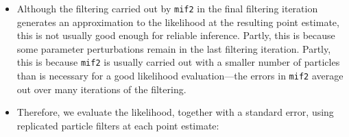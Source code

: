 \documentclass[]{article}
\newenvironment{Shaded}{\begin{snugshade}}{\end{snugshade}}
\newcommand{\KeywordTok}[1]{\textcolor[rgb]{0.13,0.29,0.53}{\textbf{#1}}}
\newcommand{\DataTypeTok}[1]{\textcolor[rgb]{0.13,0.29,0.53}{#1}}
\newcommand{\DecValTok}[1]{\textcolor[rgb]{0.00,0.00,0.81}{#1}}
\newcommand{\FloatTok}[1]{\textcolor[rgb]{0.00,0.00,0.81}{#1}}
\newcommand{\StringTok}[1]{\textcolor[rgb]{0.31,0.60,0.02}{#1}}
\newcommand{\OtherTok}[1]{\textcolor[rgb]{0.56,0.35,0.01}{#1}}
\newcommand{\OperatorTok}[1]{\textcolor[rgb]{0.81,0.36,0.00}{\textbf{#1}}}
\newcommand{\NormalTok}[1]{#1}
\begin{document}
\begin{Shaded}
\end{Shaded}

\begin{itemize}
\item
  Although the filtering carried out by \texttt{mif2} in the final
  filtering iteration generates an approximation to the likelihood at
  the resulting point estimate, this is not usually good enough for
  reliable inference. Partly, this is because some parameter
  perturbations remain in the last filtering iteration. Partly, this is
  because \texttt{mif2} is usually carried out with a smaller number of
  particles than is necessary for a good likelihood evaluation---the
  errors in \texttt{mif2} average out over many iterations of the
  filtering.
\item
  Therefore, we evaluate the likelihood, together with a standard error,
  using replicated particle filters at each point estimate:
\end{itemize}
\end{document}
